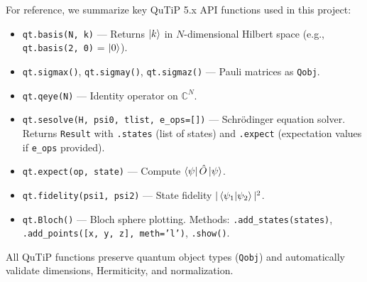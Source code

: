 \documentclass[11pt,a4paper]{article}
\theoremstyle{definition}
\theoremstyle{remark}
\newcommand{\CC}{\mathbb{C}}
\begin{document}
For reference, we summarize key QuTiP 5.x API functions used in this project:

\begin{itemize}
    \item \texttt{qt.basis(N, k)} — Returns $\ket{k}$ in $N$-dimensional Hilbert space (e.g., \texttt{qt.basis(2, 0)} = $\ket{0}$).
    \item \texttt{qt.sigmax()}, \texttt{qt.sigmay()}, \texttt{qt.sigmaz()} — Pauli matrices as \texttt{Qobj}.
    \item \texttt{qt.qeye(N)} — Identity operator on $\CC^N$.
    \item \texttt{qt.sesolve(H, psi0, tlist, e\_ops=[])} — Schrödinger equation solver. Returns \texttt{Result} with \texttt{.states} (list of states) and \texttt{.expect} (expectation values if \texttt{e\_ops} provided).
    \item \texttt{qt.expect(op, state)} — Compute $\bra{\psi} \hat{O} \ket{\psi}$.
    \item \texttt{qt.fidelity(psi1, psi2)} — State fidelity $|\braket{\psi_1}{\psi_2}|^2$.
    \item \texttt{qt.Bloch()} — Bloch sphere plotting. Methods: \texttt{.add\_states(states)}, \texttt{.add\_points([x, y, z], meth='l')}, \texttt{.show()}.
\end{itemize}

All QuTiP functions preserve quantum object types (\texttt{Qobj}) and automatically validate dimensions, Hermiticity, and normalization.
\end{document}
